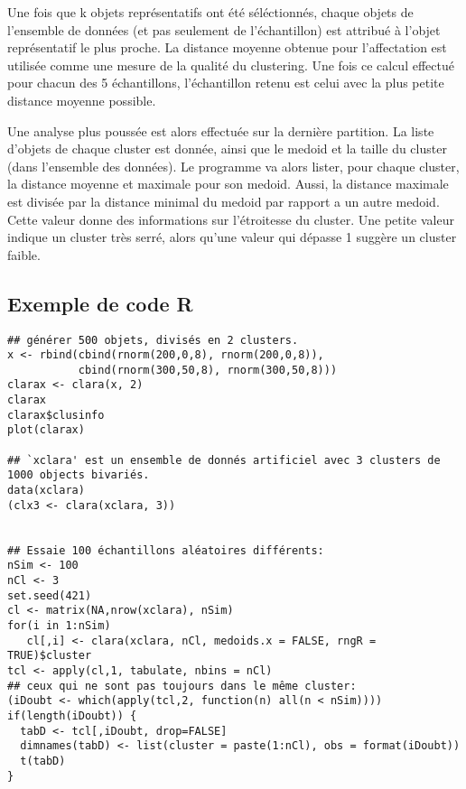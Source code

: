 \documentclass[report]{subfiles}
\begin{document}
Une fois que k objets représentatifs ont été séléctionnés, chaque objets de l'ensemble de données (et pas seulement de l'échantillon) est attribué à l'objet représentatif le plus proche. La distance moyenne obtenue pour l'affectation est utilisée comme une mesure de la qualité du clustering. Une fois ce calcul effectué pour chacun des 5 échantillons, l'échantillon retenu est celui avec la plus petite distance moyenne possible.

Une analyse plus poussée est alors effectuée sur la dernière partition. La liste d'objets de chaque cluster est donnée, ainsi que le medoid et la taille du cluster (dans l'ensemble des données). Le programme va alors lister, pour chaque cluster, la distance moyenne et maximale pour son medoid. Aussi, la distance maximale est divisée par la distance minimal du medoid par rapport a un autre medoid. Cette valeur donne des informations sur l'étroitesse du cluster. Une petite valeur indique un cluster très serré, alors qu'une valeur qui dépasse 1 suggère un cluster faible.

\newpage
\subsection{Exemple de code R} %
\begin{verbatim}
## générer 500 objets, divisés en 2 clusters.
x <- rbind(cbind(rnorm(200,0,8), rnorm(200,0,8)),
           cbind(rnorm(300,50,8), rnorm(300,50,8)))
clarax <- clara(x, 2)
clarax
clarax$clusinfo
plot(clarax)

## `xclara' est un ensemble de donnés artificiel avec 3 clusters de 1000 objects bivariés.
data(xclara)
(clx3 <- clara(xclara, 3))


## Essaie 100 échantillons aléatoires différents:
nSim <- 100
nCl <- 3 
set.seed(421)
cl <- matrix(NA,nrow(xclara), nSim)
for(i in 1:nSim)
   cl[,i] <- clara(xclara, nCl, medoids.x = FALSE, rngR = TRUE)$cluster
tcl <- apply(cl,1, tabulate, nbins = nCl)
## ceux qui ne sont pas toujours dans le même cluster:
(iDoubt <- which(apply(tcl,2, function(n) all(n < nSim))))
if(length(iDoubt)) {
  tabD <- tcl[,iDoubt, drop=FALSE]
  dimnames(tabD) <- list(cluster = paste(1:nCl), obs = format(iDoubt))
  t(tabD)
}
\end{verbatim}
\end{document}
